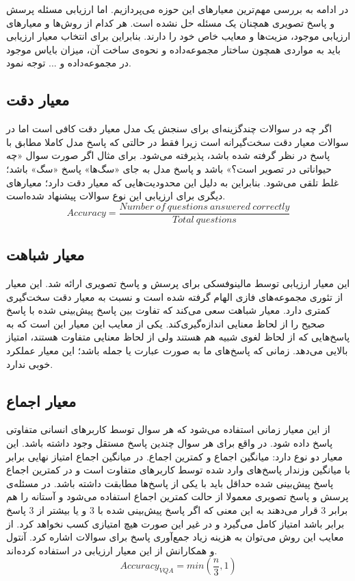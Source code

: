  در ادامه به بررسی  مهم‌ترین معیارهای این حوزه می‌پردازیم. اما ارزیابی مسئله پرسش و پاسخ تصویری همچنان یک مسئله حل نشده است. هر کدام از روش‌ها و معیارهای ارزیابی موجود، مزیت‌ها و معایب خاص خود را دارند. بنابراین برای انتخاب معیار ارزیابی باید به مواردی همچون ساختار مجموعه‌داده و نحوه‌ی ساخت آن، میزان بایاس موجود در مجموعه‌داده و ... توجه نمود. 

\subsection{معیار دقت}

		اگر چه در سوالات چندگزینه‌ای برای سنجش یک مدل معیار دقت کافی است اما در سوالات 
		معیار دقت سخت‌گیرانه است زیرا فقط در حالتی که پاسخ مدل کاملا مطابق با پاسخ در نظر گرفته شده باشد، پذیرفته می‌‌شود. برای مثال اگر صورت سوال «چه حیواناتی در تصویر است؟» باشد و پاسخ مدل به جای «سگ‌ها‌» پاسخ «سگ» باشد؛ غلط تلقی می‌شود. بنابراین به دلیل این محدودیت‌هایی که معیار دقت دارد؛ معیارهای دیگری برای ارزیابی این نوع سوالات پیشنهاد‌ شده‌است.
		\begin{equation}
		Accuracy = \frac{Number \ of \ questions \ answered \ correctly}{Total \ questions}
		\end{equation}

	
\subsection[معیار شباهت \lr{Wu-Palmer}]{معیار شباهت \cite{wu1994verb}}
	این معیار ارزیابی توسط مالینوفسکی 
	\cite{malinowski2014multi}
	برای پرسش و پاسخ تصویری ارائه شد. این معیار از تئوری مجموعه‌های فازی الهام گرفته شده است و نسبت به معیار دقت سخت‌گیری کمتری دارد. معیار شباهت 
	سعی می‌کند که تفاوت بین پاسخ پیش‌بینی شده با پاسخ صحیح  را از لحاظ معنایی اندازه‌گیری‌کند. یکی از معایب این معیار این است که به پاسخ‌هایی که از لحاظ لغوی شبیه هم هستند ولی از لحاظ معنایی متفاوت هستند، امتیاز بالایی می‌دهد. زمانی که پاسخ‌های ما به صورت عبارت یا جمله باشد؛ این  معیار عملکرد خوبی ندارد. 

\subsection{معیار اجماع}

		از این معیار زمانی استفاده می‌شود که هر سوال توسط کاربرهای انسانی متفاوتی پاسخ داده شود. در واقع برای هر سوال چندین پاسخ مستقل وجود داشته باشد. این معیار دو نوع دارد: میانگین اجماع و کمترین اجماع. در میانگین اجماع امتیاز نهایی برابر با میانگین وزندار پاسخ‌های وارد شده توسط کاربرهای متفاوت است و در کمترین اجماع پاسخ پیش‌بینی شده حداقل باید با یکی از پاسخ‌ها مطابقت داشته باشد. در مسئله‌ی پرسش و پاسخ تصویری معمولا از حالت کمترین اجماع استفاده می‌شود و آستانه را هم برابر 3 قرار می‌دهند به این معنی که اگر پاسخ پیش‌بینی شده با 3 و یا بیشتر از 3 پاسخ برابر باشد امتیاز کامل می‌گیرد و در غیر این صورت هیچ امتیازی کسب نخواهد کرد. از معایب این روش می‌توان به هزینه زیاد جمع‌آوری پاسخ برای سوالات اشاره کرد. آنتول و همکارانش از این معیار ارزیابی در 
		\cite{antol2015vqa}
		استفاده کرده‌اند.
		\begin{equation}
			Accuracy_{VQA} = min(\frac{n}{3}, 1)
		\end{equation}

